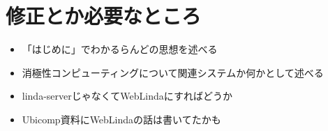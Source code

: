 \section*{修正とか必要なところ}

\begin{itemize}
  \item 「はじめに」でわかるらんどの思想を述べる
  \item 消極性コンピューティング\cite{kurihara2016}について関連システムか何かとして述べる
  \item linda-serverじゃなくてWebLindaにすればどうか
  \item Ubicomp資料\cite{shokai_furnitue}にWebLindaの話は書いてたかも
\end{itemize}

